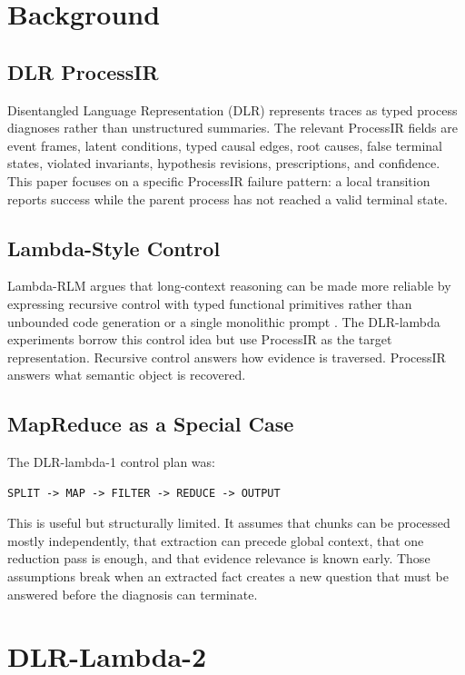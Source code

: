 \documentclass[11pt]{article}
\begin{document}
\section{Background}

\subsection{DLR ProcessIR}

Disentangled Language Representation (DLR) represents traces as typed process
diagnoses rather than unstructured summaries. The relevant ProcessIR fields are
event frames, latent conditions, typed causal edges, root causes, false terminal
states, violated invariants, hypothesis revisions, prescriptions, and
confidence. This paper focuses on a specific ProcessIR failure pattern: a local
transition reports success while the parent process has not reached a valid
terminal state.

\subsection{Lambda-Style Control}

Lambda-RLM argues that long-context reasoning can be made more reliable by
expressing recursive control with typed functional primitives rather than
unbounded code generation or a single monolithic prompt \cite{lambda_rlm}. The
DLR-lambda experiments borrow this control idea but use ProcessIR as the target
representation. Recursive control answers how evidence is traversed. ProcessIR
answers what semantic object is recovered.

\subsection{MapReduce as a Special Case}

The DLR-lambda-1 control plan was:

\begin{verbatim}
SPLIT -> MAP -> FILTER -> REDUCE -> OUTPUT
\end{verbatim}

This is useful but structurally limited. It assumes that chunks can be processed
mostly independently, that extraction can precede global context, that one
reduction pass is enough, and that evidence relevance is known early. Those
assumptions break when an extracted fact creates a new question that must be
answered before the diagnosis can terminate.

\section{DLR-Lambda-2}
\end{document}
